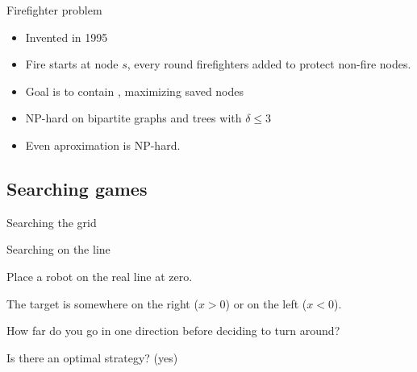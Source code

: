 \documentclass[compress]{beamer}
\newcommand{\blue}[1]{\textcolor{NordBlue}{#1}}
\newcommand{\red}[1]{\textcolor{NordRed}{#1}}
\begin{document}
\begin{frame}{Firefighter problem}
\begin{itemize}
    \item Invented in 1995
    \item Fire starts at node $s$, every round firefighters added to protect non-fire nodes.
    \item Goal is to \red{contain} {  }, maximizing \blue{saved} nodes
    \item NP-hard on bipartite graphs and trees with $\delta \leq 3$
    \item Even aproximation is NP-hard.

\end{itemize}

\end{frame}

\subsection{Searching games}

\begin{frame}{Searching the grid}
\newcommand*{\xMin}{0}%
\newcommand*{\xMax}{6}%
\newcommand*{\yMin}{0}%
\newcommand*{\yMax}{6}%
\end{frame}

\begin{frame}{Searching on the line}

Place a robot on the real line at zero.

\medskip

The \red{target} is somewhere on the right ($x > 0$) or on the left ($x < 0$).

\medskip

How far do you go in one direction before deciding to turn around?

\medskip
Is there an optimal strategy? (yes)
\end{frame}
\end{document}

